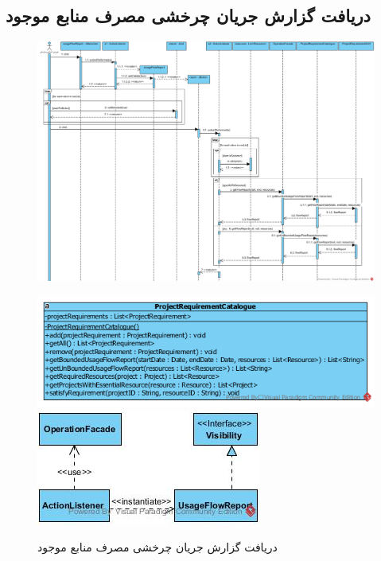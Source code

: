 \begin{landscape}
\newpage
\section{دریافت گزارش جریان چرخشی مصرف منابع موجود}
\begin{figure}[H]
	\centering
	\includegraphics[scale=0.55]{img/sequence-design/UsageFlowReport}
\end{figure}
\begin{figure}[H]
	\centering
	\includegraphics[scale=0.7]{img/sequence-design/UsageFlowReportC}
	\includegraphics[scale=0.7]{img/sequence-design/UsageFlowReportUI}
	\caption{دریافت گزارش جریان چرخشی مصرف منابع موجود}
\end{figure}

\newpage

\end{landscape}
